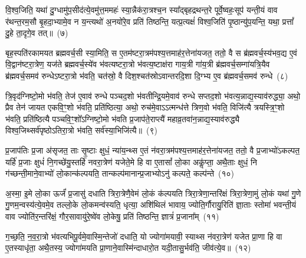 वि॒श्व॒जिति॒ यथा॑ दु॒ग्धामु॑प॒सीद॑त्ये॒वमु॑त्त॒ममहः॑ स्या॒न्नैक॑रा॒त्रश्च॒न स्या᳚द्बृहद्रथन्त॒रे पूर्वे॒ष्वहः॒सूप॑ यन्ती॒यं वाव र॑थन्त॒रम॒सौ बृ॒हदा॒भ्यामे॒व न य॒न्त्यथो॑ अ॒नयो॑रे॒व प्रति॑ तिष्ठन्ति॒ यत्प्र॒त्यक्षं॑ विश्व॒जिति॑ पृ॒ष्ठान्यु॑प॒यन्ति॒ यथा॒ प्रत्तां᳚ दु॒हे ता॒दृगे॒व तत्॥~(७)\ip

{\anuvakamend[{तेज॑ उपे॒युः प्र॒त्यक्षं॒ द्विच॑त्वारिꣳशच्च}]}

बृह॒स्पति॑रकामयत ब्रह्मवर्च॒सी स्या॒मिति॒ स ए॒तम॑ष्टरा॒त्रम॑पश्य॒त्तमाह॑र॒त्तेना॑यजत॒ ततो॒ वै स ब्र॑ह्मवर्च॒स्य॑भव॒द्य ए॒वं वि॒द्वान॑ष्टरा॒त्रेण॒ यज॑ते ब्रह्मवर्च॒स्ये॑व भ॑वत्यष्टरा॒त्रो भ॑वत्य॒ष्टाक्ष॑रा गाय॒त्री गा॑य॒त्री ब्र॑ह्मवर्च॒सम्गा॑यत्रि॒यैव ब्र॑ह्मवर्च॒समव॑ रुन्धे\-ऽष्टरा॒त्रो भ॑वति॒ चत॑स्रो॒ वै दिश॒श्चत॑स्रो\-ऽवान्तरदि॒शा दि॒ग्भ्य ए॒व ब्र॑ह्मवर्च॒समव॑ रुन्धे~(८)\ip

त्रि॒वृद॑ग्निष्टो॒मो भ॑वति॒ तेज॑ ए॒वाव॑ रुन्धे पञ्चद॒शो भ॑वतीन्द्रि॒यमे॒वाव॑ रुन्धे सप्तद॒शो भ॑वत्य॒न्नाद्य॒स्याव॑रुद्ध्या॒ अथो॒ प्रैव तेन॑ जायत एकवि॒ꣳ॒शो भ॑वति॒ प्रति॑ष्ठित्या॒ अथो॒ रुच॑मे॒वा\-ऽऽ\-त्मन्ध॑त्ते त्रिण॒वो भ॑वति॒ विजि॑त्यै त्रयस्त्रि॒ꣳ॒शो भ॑वति॒ प्रति॑ष्ठित्यै पञ्चवि॒ꣳ॒शो᳚\-ऽग्निष्टो॒मो भ॑वति प्र॒जा\-प॑ते॒राप्त्यै॑ महाव्र॒तवा॑न॒न्नाद्य॒स्याव॑रुद्ध्यै विश्व॒जिथ्सर्व॑पृष्ठो\-ऽतिरा॒त्रो भ॑वति॒ सर्व॑स्या॒भिजि॑त्यै॥~(९)\ip

{}

प्र॒जा\-प॑तिः प्र॒जा अ॑सृजत॒ ताः सृ॒ष्टाः क्षुधं॒ न्या॑य॒न्थ्स ए॒तं न॑वरा॒त्रम॑पश्य॒त्तमाह॑र॒त्तेना॑यजत॒ ततो॒ वै प्र॒जाभ्यो॑\-ऽकल्पत॒ यर्\mbox{}हि॑ प्र॒जाः क्षुधं॑ नि॒गच्छे॑यु॒स्तर्\mbox{}हि॑ नवरा॒त्रेण॑ यजेते॒मे हि वा ए॒तासां᳚ लो॒का अकॢ॑प्ता॒ अथै॒ताः क्षुधं॒ नि ग॑च्छन्ती॒माने॒वाभ्यो॑ लो॒कान्क॑ल्पयति॒ तान्कल्प॑मानान्प्र॒जाभ्यो\-ऽनु॑ कल्पते॒ कल्प॑न्ते~(१०)\ip

अ॒स्मा॒ इ॒मे लो॒का ऊर्जं॑ प्र॒जासु॑ दधाति त्रिरा॒त्रेणै॒वेमं लो॒कं क॑ल्पयति त्रिरा॒त्रेणा॒न्तरि॑क्षं त्रिरा॒त्रेणा॒मुं लो॒कं यथा॑ गु॒णे गु॒णम॒न्वस्य॑त्ये॒वमे॒व तल्लो॒के लो॒कमन्व॑स्यति॒ धृत्या॒ अशि॑थिलं भावाय॒ ज्योति॒र्गौरायु॒रिति॑ ज्ञा॒ताः स्तोमा॑ भवन्ती॒यं वाव ज्योति॑र॒न्तरि॑क्षं॒ गौर॒सावायु॑रे॒ष्वे॑व लो॒केषु॒ प्रति॑ तिष्ठन्ति॒ ज्ञात्रं॑ प्र॒जाना᳚म्~(११)\ip

ग॒च्छ॒ति॒ न॒व॒रा॒त्रो भ॑वत्यभिपू॒र्वमे॒वास्मि॒न्तेजो॑ दधाति॒ यो ज्योगा॑मयावी॒ स्याथ्स न॑वरा॒त्रेण॑ यजेत प्रा॒णा हि वा ए॒तस्याधृ॑ता॒ अथै॒तस्य॒ ज्योगा॑मयति प्रा॒णाने॒वास्मि॑न्दाधारो॒त यदी॒तासु॒र्भव॑ति॒ जीव॑त्ये॒व॥~(१२)\ip

{\anuvakamend[{कल्प॑न्ते प्र॒जाना॒न्त्रय॑स्त्रिꣳशच्च}]}

